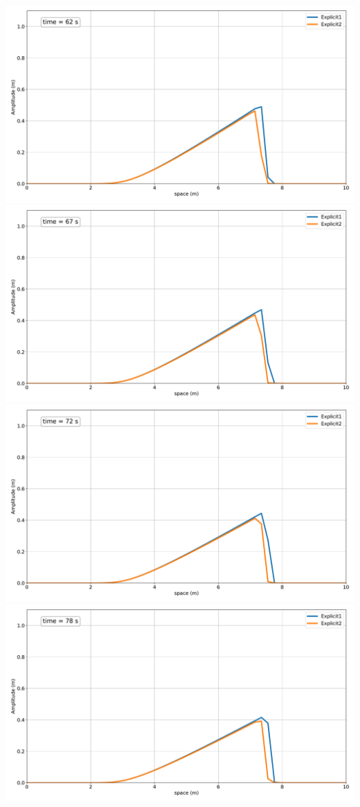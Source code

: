 \includegraphics[width=\linewidth]{../BurgersEquation/images/expl12.pdf}
\includegraphics[width=\linewidth]{../BurgersEquation/images/expl13.pdf}
\includegraphics[width=\linewidth]{../BurgersEquation/images/expl14.pdf}
\includegraphics[width=\linewidth]{../BurgersEquation/images/expl15.pdf}
